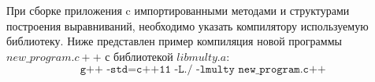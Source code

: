 При сборке приложения c импортированными методами и структурами построения выравниваний, необходимо указать компилятору используемую библиотеку. Ниже представлен пример компиляция новой программы $new\_program.c++$ с библиотекой $libmulty.a$: 
\begin{equation*}
\texttt{g++ -std=c++11 -L./ -lmulty new\_program.c++ }
\end{equation*}